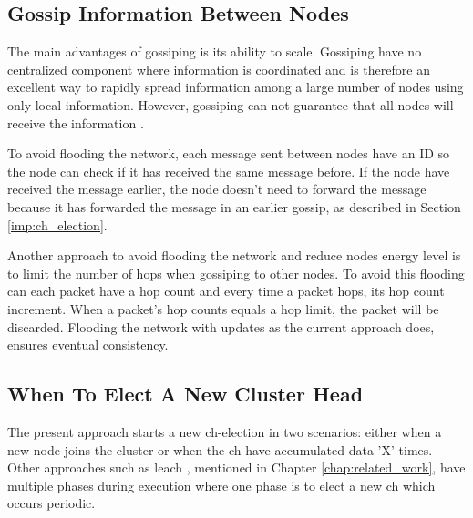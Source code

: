 \documentclass[USenglish]{uit-thesis}
\begin{document}






\subsection{Gossip Information Between Nodes}
The main advantages of gossiping is its ability to scale. Gossiping have no centralized component where information is coordinated and is therefore an excellent way to rapidly spread information among a large number of nodes using only local information. However, gossiping can not guarantee that all nodes will receive the information \cite{demers}.

To avoid flooding the network, each message sent between nodes have an ID so the node can check if it has received the same message before. If the node have received the message earlier, the node doesn't need to forward the message because it has forwarded the message in an earlier gossip, as described in Section \ref{imp:ch_election}.

Another approach to avoid flooding the network and reduce nodes energy level is to limit the number of hops when gossiping to other nodes. To avoid this flooding can each packet have a hop count and every time a packet hops, its hop count increment. When a packet's hop counts equals a hop limit, the packet will be discarded. Flooding the network with updates as the current approach does, ensures eventual consistency.
 
 
\subsection{When To Elect A New Cluster Head}
The present approach starts a new \gls{ch}-election in two scenarios: either when a new node joins the cluster or when the \gls{ch} have accumulated data 'X' times. Other approaches such as \gls{leach} \cite{leach}, mentioned in Chapter \ref{chap:related_work}, have multiple phases during execution where one phase is to elect a new \gls{ch} which occurs periodic.
\end{document}

